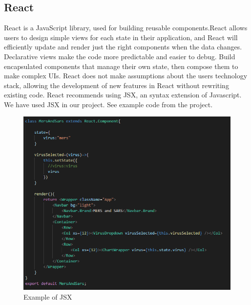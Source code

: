 \subsection{React}
React is a JavaScript library, used for building reusable components.React allows users to design simple views for each state in their application, and React will efficiently update and render just the right components when the data changes.
Declarative views make the code more predictable and easier to debug. Build encapsulated components that manage their own state, then compose them to make complex UIs.
React does not make assumptions about the users technology stack, allowing the development of new features in React without rewriting existing code.\cite{react}
React recommends using JSX, an syntax extension of Javascript. We have used JSX in our project.
See example code from the project.
\begin{figure}
    \centering
    \includegraphics[scale=0.6]{img/jsx.PNG}
    \caption{Example of JSX}
    \label{fig:my_label4}
\end{figure}


